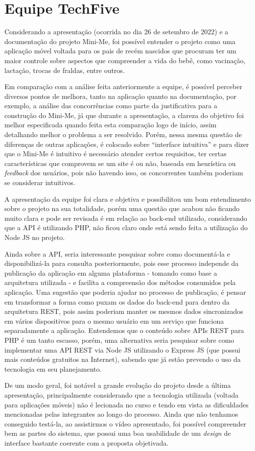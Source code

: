 \section{Equipe TechFive}

Considerando a apresentação (ocorrida no dia 26 de setembro de 2022) e a documentação do projeto Mini-Me, foi possível entender o projeto como uma aplicação móvel voltada para os pais de recém nascidos que procuram ter um maior controle sobre aspectos que compreender a vida do bebê, como vacinação, lactação, trocas de fraldas, entre outros. 

Em comparação com a análise feita anteriormente a equipe, é possível perceber diversos pontos de melhora, tanto na aplicação quanto na documentação, por exemplo, a análise das concorrências como parte da justificativa para a construção do Mini-Me, já que durante a apresentação, a clareza do objetivo foi melhor especificada quando feita esta comparação logo de início, assim detalhando melhor o problema a ser resolvido. Porém, nessa mesma questão de diferenças de outras aplicações, é colocado sobre “interface intuitiva” e para dizer que o Mini-Me é intuitivo é necessário atender certos requisitos, ter certas características que comprovem se um site é ou não, baseada em heurística ou \textsl{feedback} dos usuários, pois não havendo isso, os concorrentes também poderiam se considerar intuitivos.

A apresentação da equipe foi clara e objetiva e possibilitou um bom entendimento sobre o projeto na sua totalidade, porém uma questão que acabou não ficando muito clara e pode ser revisada é em relação ao back-end utilizado, considerando que a API é utilizando PHP, não ficou claro onde está sendo feita a utilização do Node JS no projeto. 

Ainda sobre a API, seria interessante pesquisar sobre como documentá-la e disponibilizá-la para consulta posteriormente, pois esse processo independe da publicação da aplicação em alguma plataforma - tomando como base a arquitetura utilizada - e facilita a compreensão dos métodos consumidos pela aplicação. Uma sugestão que poderia ajudar no processo de publicação, é pensar em transformar a forma como puxam os dados do back-end para dentro da arquitetura REST, pois assim poderiam manter os mesmos dados sincronizados em vários dispositivos para o mesmo usuário em um serviço que funciona separadamente a aplicação. Entendemos que o conteúdo sobre APIs REST para PHP é um tanto escasso, porém, uma alternativa seria pesquisar sobre como implementar uma API REST via Node JS utilizando o Express JS (que possui mais conteúdos gratuitos na Internet), sabendo que já estão prevendo o uso da tecnologia em seu planejamento.

De um modo geral, foi notável a grande evolução do projeto desde a última apresentação, principalmente considerando que a tecnologia utilizada (voltada para aplicações móveis) não é lecionada no curso e tendo em vista as dificuldades mencionadas pelas integrantes ao longo do processo. Ainda que não tenhamos conseguido testá-la, ao assistirmos o vídeo apresentado, foi possível compreender bem as partes do sistema, que possui uma boa usabilidade de um \textsl{design} de interface bastante coerente com a proposta objetivada.